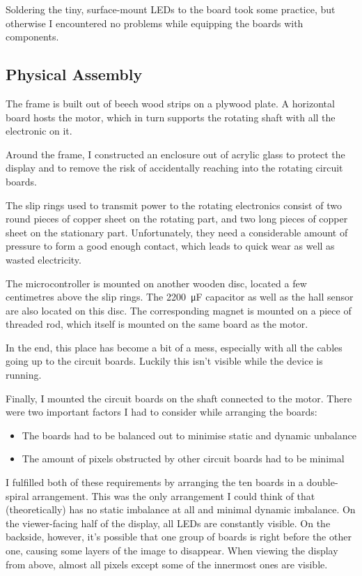\documentclass[a4paper, 11pt, titlepage]{article}
\begin{document}
Soldering the tiny, surface-mount LEDs to the board took some practice, but otherwise I
encountered no problems while equipping the boards with components.


\subsection{Physical Assembly}

The frame is built out of beech wood strips on a plywood plate. A horizontal board hosts the
motor, which in turn supports the rotating shaft with all the electronic on it.

Around the frame, I constructed an enclosure out of acrylic glass to protect the display and to
remove the risk of accidentally reaching into the rotating circuit boards.

The slip rings used to transmit power to the rotating electronics consist of two round pieces of
copper sheet on the rotating part, and two long pieces of copper sheet on the stationary part.
Unfortunately, they need a considerable amount of pressure to form a good enough contact, which
leads to quick wear as well as wasted electricity.

The microcontroller is mounted on another wooden disc, located a few centimetres above the slip
rings. The \SI{2200}{\micro\farad} capacitor as well as the hall sensor are also located on this
disc. The corresponding magnet is mounted on a piece of threaded rod, which itself is mounted on
the same board as the motor.

In the end, this place has become a bit of a mess, especially with all the cables going up to the
circuit boards. Luckily this isn't visible while the device is running.

Finally, I mounted the circuit boards on the shaft connected to the motor. There were two
important factors I had to consider while arranging the boards:

\begin{itemize}
\item The boards had to be balanced out to minimise static and dynamic unbalance
\item The amount of pixels obstructed by other circuit boards had to be minimal
\end{itemize}

I fulfilled both of these requirements by arranging the ten boards in a double-spiral arrangement.
This was the only arrangement I could think of that (theoretically) has no static imbalance at all
and minimal dynamic imbalance. On the viewer-facing half of the display, all LEDs are constantly
visible. On the backside, however, it's possible that one group of boards is right before the
other one, causing some layers of the image to disappear. When viewing the display from above,
almost all pixels except some of the innermost ones are visible.
\end{document}
